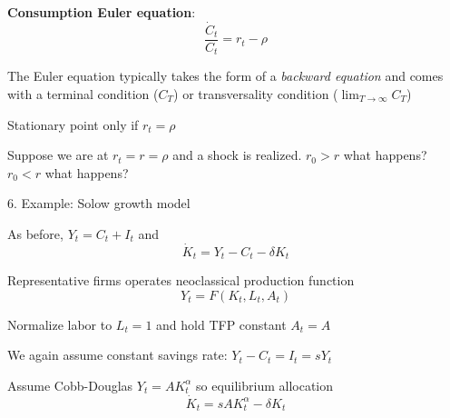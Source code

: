 \documentclass[11pt, aspectratio=169]{beamer}
\newenvironment{witemize}{\itemize\addtolength{\itemsep}{10pt}}{\enditemize}
\begin{document}
\begin{frame}{}
\textbf{Consumption Euler equation}:
\begin{equation*}
\frac{\dot C_t}{C_t} = r_t - \rho
\end{equation*}
\begin{witemize}
\item The Euler equation typically takes the form of a \textit{backward equation} and comes with a terminal condition ($C_T$) or transversality condition ($\lim_{T\to\infty} C_T$)

\item Stationary point only if $r_t = \rho$

\item Suppose we are at $r_t = r = \rho$ and a shock is realized. $r_0 > r$ what happens? $r_0 < r$ what happens? 
\end{witemize}
\end{frame}


\begin{frame}{6. Example: Solow growth model}
\begin{witemize}
\item As before, $Y_t = C_t + I_t$ and 
\begin{equation*}
	\dot K_t = Y_t - C_t - \delta K_t
\end{equation*}

\item Representative firms operates neoclassical production function
\begin{equation*}
	Y_t = F(K_t, L_t, A_t)
\end{equation*}

\item Normalize labor to $L_t = 1$ and hold TFP constant $A_t = A$

\item We again assume constant savings rate: $Y_t - C_t = I_t = s Y_t$

\item Assume Cobb-Douglas $Y_t = A K_t^\alpha$ so equilibrium allocation
\begin{equation*}
	\dot K_t = s A K_t^\alpha - \delta K_t
\end{equation*}
\end{witemize}
\end{frame}
\end{document}
